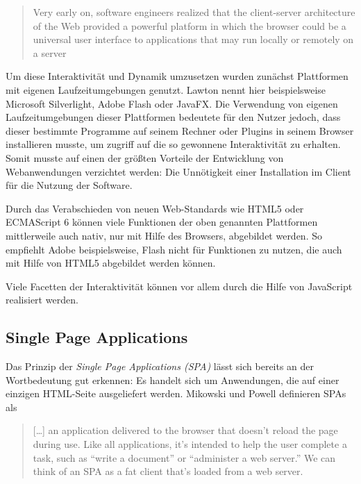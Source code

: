 \begin{quote}
  Very early on, software engineers realized that the client-server architecture of the Web provided a powerful platform in which the browser could be a universal user interface to applications that may run locally or remotely on a server \cite{Jazayeri:2007:TWA:1253532.1254719}
\end{quote}

Um diese Interaktivität und Dynamik umzusetzen wurden zunächst Plattformen mit eigenen Laufzeitumgebungen genutzt. Lawton \cite{lawton2008new} nennt hier beispielsweise Microsoft Silverlight, Adobe Flash oder JavaFX.
Die Verwendung von eigenen Laufzeitumgebungen dieser Plattformen  bedeutete für den Nutzer jedoch,  dass dieser bestimmte Programme auf seinem Rechner oder Plugins in seinem Browser installieren musste, um zugriff auf die so gewonnene Interaktivität zu erhalten. Somit musste auf einen der größten Vorteile der Entwicklung von Webanwendungen verzichtet werden: Die Unnötigkeit einer Installation im Client für die Nutzung der Software.

Durch das Verabschieden von neuen Web-Standards wie HTML5 oder ECMAScript 6 können viele Funktionen der oben genannten Plattformen mittlerweile auch nativ, nur mit Hilfe des Browsers, abgebildet werden. So empfiehlt Adobe beispielsweise, Flash nicht für Funktionen zu nutzen, die auch mit Hilfe von HTML5 abgebildet werden können\footnotemark{}.


Viele Facetten der Interaktivität können vor allem durch die Hilfe von JavaScript realisiert werden.

\subsection{Single Page Applications}
Das Prinzip der \textit{Single Page Applications (SPA)} lässt sich bereits an der Wortbedeutung gut erkennen: Es handelt sich um Anwendungen, die auf einer einzigen HTML-Seite ausgeliefert werden.
Mikowski und Powell definieren SPAs als

\begin{quote}
  […] an application delivered to the browser that doesn’t reload the page during use. Like all applications, it’s intended to help the user complete a task, such as “write a document” or “administer a web server.” We can think of an SPA as a fat client that’s loaded from a web server. \cite{MikowskiPowell201309}
\end{quote}

